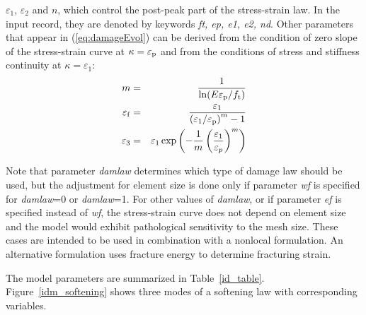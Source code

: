 \documentclass[a4paper]{article}
\newcommand{\param}[1]{{\it #1}}
\begin{document}
\begin{itemize}
$\varepsilon_1$, $\varepsilon_2$ and $n$, which control the post-peak part of the stress-strain law. In the input record, they are denoted by keywords
\param{ft, ep, e1, e2, nd}.
Other parameters that appear in (\ref{eq:damageEvol}) can be derived from the condition of zero
slope of the stress-strain curve at $\kappa=\varepsilon_{\rm p}$ and from the conditions of stress and
stiffness continuity at $\kappa=\varepsilon_1$:
\begin{eqnarray}\label{eqparams1}
m&=&\frac{1}{\ln(E\varepsilon_{\rm p}/f_{\rm t})}\\
\label{eqparams2}
\varepsilon_{\rm f}&=&\frac{\varepsilon_1}{\left(\varepsilon_1/\varepsilon_{\rm p}\right)^m -1}\\
\varepsilon_3&=&\varepsilon_1\exp\left(-\frac{1}{m}\left(\frac{\varepsilon_1}{\varepsilon_p}\right)^m\right)
\label{eqparams3}
\end{eqnarray}
\end{itemize} 

Note that parameter {\it damlaw} determines which type of damage law
should be used, but the adjustment for element size is done only if
parameter {\it wf} is specified for {\it damlaw}=0 or {\it damlaw}=1. 
For other values of {\it damlaw}, or if parameter {\it ef} 
is specified instead of {\it wf}, the stress-strain curve does not depend
on element size and the model would exhibit pathological sensitivity
to the mesh size. These cases are intended to be used in combination
with a nonlocal formulation. An alternative formulation uses fracture energy
to determine fracturing strain.

The model parameters are summarized in Table~\ref{id_table}. Figure~\ref{idm_softening} shows
three modes of a softening law with corresponding variables.
\end{document}
